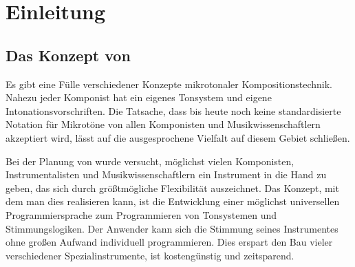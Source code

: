 \iffalse
\vfill

\begin{center}
\index{Autoren}
\vspace{1cm}
\textbf{Mutabor Soft, Gesellschaft bürgerlichen Rechts}
\vspace{-1cm}
\end{center}

Volker Abel       \hfill   Peter Reiss \\
Taubenweg 14      \hfill   Liebigstr. 9 \\
W-6101 Roßdorf    \hfill   W-6100 Darmstadt \\
Tel: 06154/81888  \hfill   Tel+Fax: 06151/292257 \\


\tableofcontents
\fi
%
%


\part{Einleitung}
\label{teilEinleit}


\chapter{Das Konzept von \texorpdfstring{\mutabor{}}{Mutabor}}\label{cha:das-konzept-von-mutabor}

Es gibt eine Fülle verschiedener Konzepte mikrotonaler
Kompositionstechnik. Nahezu jeder Komponist hat ein eigenes
Tonsystem und eigene Intonationsvorschriften. Die Tatsache, dass
bis heute noch keine standardisierte Notation für Mikrotöne von
allen Komponisten und Musikwissenschaftlern akzeptiert wird, lässt
auf die ausgesprochene Vielfalt auf diesem Gebiet schließen.

Bei der Planung von \mutabor{} wurde versucht,
möglichst vielen Komponisten, Instrumentalisten und
Musikwissenschaftlern ein Instrument in die Hand zu geben, das
sich durch größtmögliche Flexibilität auszeichnet. Das Konzept,
mit dem man dies realisieren kann, ist die Entwicklung einer
möglichst universellen Programmiersprache zum Programmieren von
Tonsystemen und Stimmungslogiken. Der Anwender kann sich die
Stimmung seines Instrumentes ohne großen Aufwand individuell
programmieren. Dies erspart den Bau vieler verschiedener
Spezialinstrumente, ist kostengünstig und zeitsparend.

